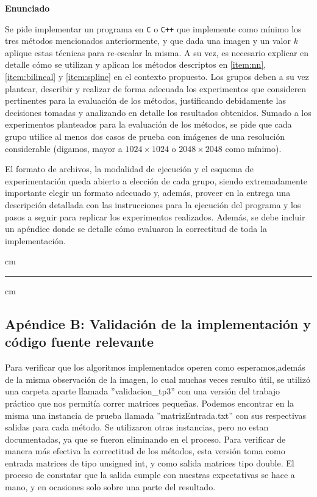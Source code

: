 \documentclass[a4paper]{article}
\begin{document}
\vskip 5pt

{\bf\noindent Enunciado}

Se pide implementar un programa en \verb-C- o \verb-C++- que implemente como m\'inimo los tres m\'etodos mencionados anteriormente, y que dada una imagen y un valor $k$ aplique estas t\'ecnicas para re-escalar la misma. A su vez, es necesario explicar en detalle c\'omo se utilizan y aplican los m\'etodos descriptos en \ref{item:nn}, \ref{item:bilineal} y \ref{item:spline} en el contexto propuesto. Los grupos deben a su vez plantear, describir y realizar de forma adecuada los experimentos que consideren pertinentes para la evaluaci\'on de los m\'etodos, justificando debidamente las decisiones tomadas y analizando en detalle los resultados obtenidos. Sumado a los experimentos planteados para la evaluaci\'on de los m\'etodos, se pide que cada grupo utilice al menos dos casos de prueba con im\'agenes de una resoluci\'on considerable (digamos, mayor a $1024\times 1024$ o $2048\times 2048$ como m\'inimo).

El formato de archivos, la modalidad de ejecuci\'on y el esquema de experimentaci\'on queda abierto a elecci\'on de cada grupo, siendo extremadamente importante elegir un formato adecuado y, adem\'as, proveer en la entrega una descripci\'on detallada con las instrucciones para la ejecuci\'on del programa y los pasos a seguir para replicar los experimentos realizados. Adem\'as, se debe incluir un ap\'endice donde se detalle c\'omo evaluaron la correctitud de toda la implementaci\'on.

 cm
\hrule
{} cm


\subsection*{Apéndice B: Validación de la implementación y código fuente relevante}

Para verificar que los algoritmos implementados operen como esperamos,además de la misma observación de la imagen, lo cual muchas veces resulto útil, se utiliz\'o una carpeta aparte llamada ''validacion_tp3'' con una versión del trabajo práctico que nos permitía correr matrices pequeñas. Podemos encontrar en la misma una instancia de prueba llamada ''matrizEntrada.txt'' con sus respectivas salidas para cada método. Se utilizaron otras instancias, pero no estan documentadas, ya que se fueron eliminando en el proceso. Para verificar de manera m\'as efectiva la correctitud de los métodos, esta versión toma como entrada matrices de tipo unsigned int, y como salida matrices tipo double. El proceso de constatar que la salida cumple con nuestras expectativas se hace a mano, y en ocasiones solo sobre una parte del resultado.
\end{document}
